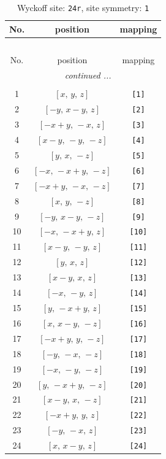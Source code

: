 \documentclass[fleqn,8pt]{jsarticle}
\begin{document}
\begin{longtable}{ccc}
\caption{Wyckoff site: {\tt 24r}, site symmetry: {\tt 1}}
 \\
 \hline \hline
No. & position & mapping \\ \hline \endfirsthead

\multicolumn{2}{l}{\tablename\ \thetable{}} \\
 \hline \hline
No. & position & mapping \\ \hline \endhead

 \hline \hline
\multicolumn{2}{r}{\footnotesize\it continued ...} \\ \endfoot

 \hline \hline
\multicolumn{2}{r}{} \\ \endlastfoot

1 & $\left[ x,\, y,\, z \right]$ & {\tt [1]} \\ \hline
2 & $\left[ - y,\, x - y,\, z \right]$ & {\tt [2]} \\ \hline
3 & $\left[ - x + y,\, - x,\, z \right]$ & {\tt [3]} \\ \hline
4 & $\left[ x - y,\, - y,\, - z \right]$ & {\tt [4]} \\ \hline
5 & $\left[ y,\, x,\, - z \right]$ & {\tt [5]} \\ \hline
6 & $\left[ - x,\, - x + y,\, - z \right]$ & {\tt [6]} \\ \hline
7 & $\left[ - x + y,\, - x,\, - z \right]$ & {\tt [7]} \\ \hline
8 & $\left[ x,\, y,\, - z \right]$ & {\tt [8]} \\ \hline
9 & $\left[ - y,\, x - y,\, - z \right]$ & {\tt [9]} \\ \hline
10 & $\left[ - x,\, - x + y,\, z \right]$ & {\tt [10]} \\ \hline
11 & $\left[ x - y,\, - y,\, z \right]$ & {\tt [11]} \\ \hline
12 & $\left[ y,\, x,\, z \right]$ & {\tt [12]} \\ \hline
13 & $\left[ x - y,\, x,\, z \right]$ & {\tt [13]} \\ \hline
14 & $\left[ - x,\, - y,\, z \right]$ & {\tt [14]} \\ \hline
15 & $\left[ y,\, - x + y,\, z \right]$ & {\tt [15]} \\ \hline
16 & $\left[ x,\, x - y,\, - z \right]$ & {\tt [16]} \\ \hline
17 & $\left[ - x + y,\, y,\, - z \right]$ & {\tt [17]} \\ \hline
18 & $\left[ - y,\, - x,\, - z \right]$ & {\tt [18]} \\ \hline
19 & $\left[ - x,\, - y,\, - z \right]$ & {\tt [19]} \\ \hline
20 & $\left[ y,\, - x + y,\, - z \right]$ & {\tt [20]} \\ \hline
21 & $\left[ x - y,\, x,\, - z \right]$ & {\tt [21]} \\ \hline
22 & $\left[ - x + y,\, y,\, z \right]$ & {\tt [22]} \\ \hline
23 & $\left[ - y,\, - x,\, z \right]$ & {\tt [23]} \\ \hline
24 & $\left[ x,\, x - y,\, z \right]$ & {\tt [24]} \\
\end{longtable}
\end{document}
